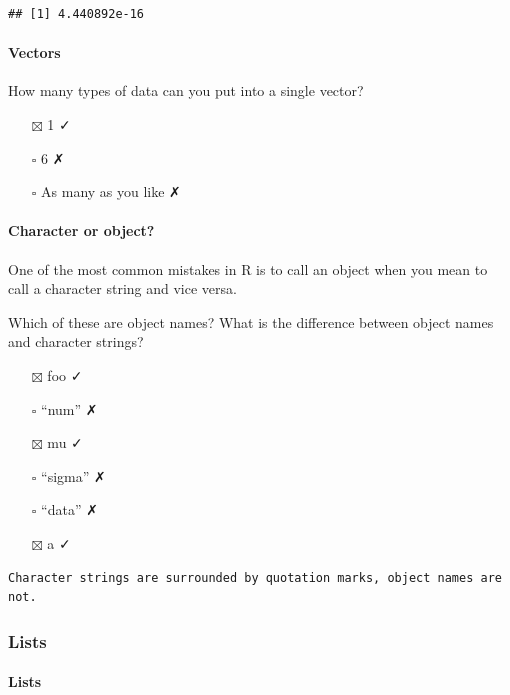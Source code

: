 \documentclass[
]{article}
\providecommand{\tightlist}{%
  \setlength{\itemsep}{0pt}\setlength{\parskip}{0pt}}
\begin{document}
\begin{verbatim}
## [1] 4.440892e-16
\end{verbatim}

\hypertarget{vectors-1}{%
\paragraph{Vectors}\label{vectors-1}}

How many types of data can you put into a single vector?

\begin{itemize}
\tightlist
\item[$\boxtimes$]
  1 ✓
\item[$\square$]
  6 ✗
\item[$\square$]
  As many as you like ✗
\end{itemize}

\hypertarget{character-or-object}{%
\paragraph{Character or object?}\label{character-or-object}}

One of the most common mistakes in R is to call an object when you mean
to call a character string and vice versa.

Which of these are object names? What is the difference between object
names and character strings?

\begin{itemize}
\tightlist
\item[$\boxtimes$]
  foo ✓
\item[$\square$]
  ``num'' ✗
\item[$\boxtimes$]
  mu ✓
\item[$\square$]
  ``sigma'' ✗
\item[$\square$]
  ``data'' ✗
\item[$\boxtimes$]
  a ✓
\end{itemize}

\begin{verbatim}
Character strings are surrounded by quotation marks, object names are not.
\end{verbatim}

\hypertarget{lists}{%
\subsubsection{Lists}\label{lists}}

\hypertarget{lists-1}{%
\paragraph{Lists}\label{lists-1}}
\end{document}

